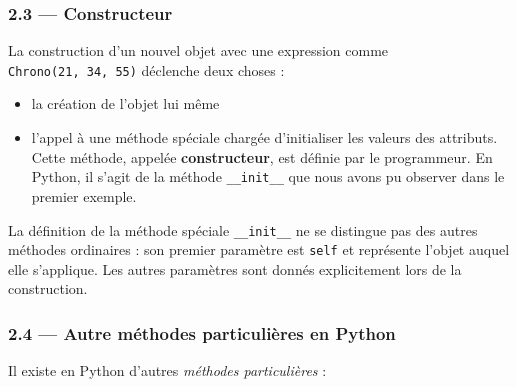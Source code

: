 \documentclass[a4paper,17pt]{extarticle}
\providecommand{\tightlist}{%
      \setlength{\itemsep}{0pt}\setlength{\parskip}{0pt}}
\begin{document}
    \hypertarget{constructeur}{%
\subsubsection{2.3 --- Constructeur}\label{constructeur}}
\begin{retenir}
    La construction d'un nouvel objet avec une expression comme
\texttt{Chrono(21,\ 34,\ 55)} déclenche deux choses :

\begin{itemize}
\tightlist
\item
  la création de l'objet lui même
\item
  l'appel à une méthode spéciale chargée d'initialiser les valeurs des
  attributs. Cette méthode, appelée \textbf{constructeur}, est définie
  par le programmeur. En Python, il s'agit de la méthode
  \texttt{\_\_init\_\_} que nous avons pu observer dans le premier
  exemple.
\end{itemize}

La définition de la méthode spéciale \texttt{\_\_init\_\_} ne se
distingue pas des autres méthodes ordinaires : son premier paramètre est
\texttt{self} et représente l'objet auquel elle s'applique. Les autres
paramètres sont donnés explicitement lors de la construction.

        \end{retenir}
    \hypertarget{autre-muxe9thodes-particuliuxe8res-en-python}{%
\subsubsection{2.4 --- Autre méthodes particulières en
Python}\label{autre-muxe9thodes-particuliuxe8res-en-python}}

    Il existe en Python d'autres \emph{méthodes particulières} :
\end{document}
